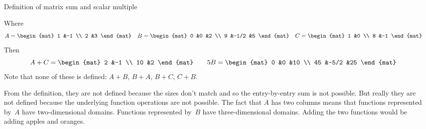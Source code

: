 \documentclass[9pt,t]{beamer}
\begin{document}
\begin{frame}{Definition of matrix sum and scalar multiple}

\pause
\ex
Where
\begin{equation*}
  A=
  \begin{mat}
    1  &-1 \\
    2  &3
  \end{mat}
  \quad
  B=
  \begin{mat}
    0  &0     &2  \\
    9  &-1/2  &5
  \end{mat}
  \quad
  C=
  \begin{mat}
    1  &0 \\
    8  &-1
  \end{mat}
\end{equation*}
Then
\begin{equation*}
  A+C=
  \begin{mat}
    2  &-1  \\
    10 &2
  \end{mat}
  \qquad
  5B=
  \begin{mat}
    0  &0    &10 \\
    45 &-5/2 &25 
  \end{mat}
\end{equation*}
Note that none of these is defined: $A+B$, $B+A$, 
$B+C$, $C+B$.

From the definition, they are not defined 
because the sizes don't match and so
the entry-by-entry sum is not possible.
But really they are not defined because the underlying function operations
are not possible.
The fact that $A$ has two columns means that
functions represented by~$A$ have two-dimensional domains.
Functions represented by~$B$ have three-dimensional domains.
Adding the two functions would be adding apples and oranges.
\end{frame}
\end{document}
